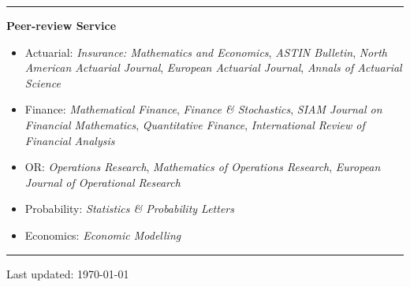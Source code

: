 \documentclass[10pt]{article}
\begin{document}
\rule[4pt]{17cm}{0.3pt}
\medskip
{\large \bf Peer-review Service}
\medskip
\nopagebreak[4]

\begin{itemize}
  \item Actuarial: \emph{Insurance: Mathematics and Economics}, \emph{ASTIN Bulletin}, \emph{North American Actuarial Journal}, \emph{European Actuarial Journal}, \emph{Annals of Actuarial Science}
  \item Finance: \emph{Mathematical Finance}, \emph{Finance \& Stochastics}, \emph{SIAM Journal on Financial Mathematics}, \emph{Quantitative Finance}, \emph{International Review of Financial Analysis}
  \item OR: \emph{Operations Research}, \emph{Mathematics of Operations Research}, \emph{European Journal of Operational Research}
  \item Probability: \emph{Statistics \& Probability Letters}
  \item Economics: \emph{Economic Modelling}
\end{itemize}

\rule[4pt]{17cm}{0.3pt}
\begin{center}
    {\footnotesize Last updated: \today}
\end{center}
\end{document}
